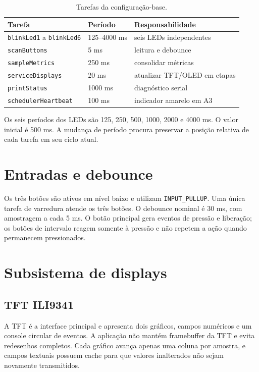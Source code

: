 \documentclass[12pt,a4paper]{article}
\begin{document}
\begin{table}[htbp]
\centering
\caption{Tarefas da configuração-base.}
\begin{tabularx}{\textwidth}{@{}Y l Y@{}}
\toprule
Tarefa & Período & Responsabilidade \\
\midrule
\texttt{blinkLed1} a \texttt{blinkLed6} & 125--4000 ms & seis LEDs independentes \\
\texttt{scanButtons} & 5 ms & leitura e debounce \\
\texttt{sampleMetrics} & 250 ms & consolidar métricas \\
\texttt{serviceDisplays} & 20 ms & atualizar TFT/OLED em etapas \\
\texttt{printStatus} & 1000 ms & diagnóstico serial \\
\texttt{schedulerHeartbeat} & 100 ms & indicador amarelo em A3 \\
\bottomrule
\end{tabularx}
\end{table}

Os seis períodos dos LEDs são 125, 250, 500, 1000, 2000 e 4000 ms. O valor
inicial é 500 ms. A mudança de período procura preservar a posição relativa de
cada tarefa em seu ciclo atual.

\section{Entradas e debounce}

Os três botões são ativos em nível baixo e utilizam \texttt{INPUT\_PULLUP}. Uma
única tarefa de varredura atende os três botões. O debounce nominal é 30 ms,
com amostragem a cada 5 ms. O botão principal gera eventos de pressão e
liberação; os botões de intervalo reagem somente à pressão e não repetem a ação
quando permanecem pressionados.

\section{Subsistema de displays}

\subsection{TFT ILI9341}

A TFT é a interface principal e apresenta dois gráficos, campos numéricos e um
console circular de eventos. A aplicação não mantém framebuffer da TFT e evita
redesenhos completos. Cada gráfico avança apenas uma coluna por amostra, e
campos textuais possuem cache para que valores inalterados não sejam novamente
transmitidos.
\end{document}
